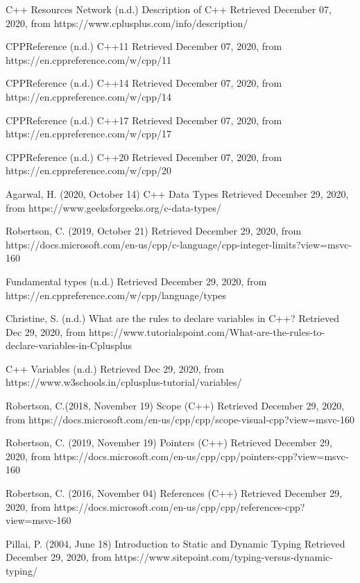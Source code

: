 \documentclass[12pt]{article}
\begin{document}
\begin{thebibliography}{50}
C++ Resources Network (n.d.) Description of C++ Retrieved December 07, 2020, from https://www.cplusplus.com/info/description/

CPPReference (n.d.) C++11 Retrieved December 07, 2020, from https://en.cppreference.com/w/cpp/11

CPPReference (n.d.) C++14 Retrieved December 07, 2020, from https://en.cppreference.com/w/cpp/14

CPPReference (n.d.) C++17 Retrieved December 07, 2020, from https://en.cppreference.com/w/cpp/17

CPPReference (n.d.) C++20 Retrieved December 07, 2020, from https://en.cppreference.com/w/cpp/20

Agarwal, H. (2020, October 14) C++ Data Types Retrieved December 29, 2020, from https://www.geeksforgeeks.org/c-data-types/

Robertson, C. (2019, October 21) Retrieved December 29, 2020, from https://docs.microsoft.com/en-us/cpp/c-language/cpp-integer-limits?view=msvc-160

Fundamental types (n.d.) Retrieved December 29, 2020, from https://en.cppreference.com/w/cpp/language/types

Christine, S. (n.d.) What are the rules to declare variables in C++? Retrieved Dec 29, 2020, from https://www.tutorialspoint.com/What-are-the-rules-to-declare-variables-in-Cplusplus

C++ Variables (n.d.) Retrieved Dec 29, 2020, from https://www.w3schools.in/cplusplus-tutorial/variables/

Robertson, C.(2018, November 19) Scope (C++) Retrieved December 29, 2020, from https://docs.microsoft.com/en-us/cpp/cpp/scope-visual-cpp?view=msvc-160

Robertson, C. (2019, November 19) Pointers (C++) Retrieved December 29, 2020, from https://docs.microsoft.com/en-us/cpp/cpp/pointers-cpp?view=msvc-160

Robertson, C. (2016, November 04) References (C++) Retrieved December 29, 2020, from https://docs.microsoft.com/en-us/cpp/cpp/references-cpp?view=msvc-160

Pillai, P. (2004, June 18) Introduction to Static and Dynamic Typing Retrieved December 29, 2020, from https://www.sitepoint.com/typing-versus-dynamic-typing/


\end{thebibliography}
\end{document}

